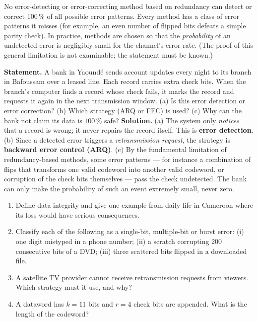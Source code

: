 \documentclass[11pt]{article}
\begin{document}
\begin{propriete}
No error-detecting or error-correcting method based on redundancy can detect or correct $100\,\%$ of all possible error patterns. Every method has a class of error patterns it misses (for example, an even number of flipped bits defeats a simple parity check). In practice, methods are chosen so that the \emph{probability} of an undetected error is negligibly small for the channel's error rate. (The proof of this general limitation is not examinable; the statement must be known.)
\end{propriete}

\begin{exoresolu}
\textbf{Statement.} A bank in Yaoundé sends account updates every night to its branch in Bafoussam over a leased line. Each record carries extra check bits. When the branch's computer finds a record whose check fails, it marks the record and requests it again in the next transmission window. (a) Is this error detection or error correction? (b) Which strategy (ARQ or FEC) is used? (c) Why can the bank not claim its data is $100\,\%$ safe?
\tcblower
\textbf{Solution.} (a) The system only \emph{notices} that a record is wrong; it never repairs the record itself. This is \textbf{error detection}. (b) Since a detected error triggers a \emph{retransmission request}, the strategy is \textbf{backward error control (ARQ)}. (c) By the fundamental limitation of redundancy-based methods, some error patterns --- for instance a combination of flips that transforms one valid codeword into another valid codeword, or corruption of the check bits themselves --- pass the check undetected. The bank can only make the probability of such an event extremely small, never zero.
\end{exoresolu}

\begin{exercice}
\begin{enumerate}
\item Define data integrity and give one example from daily life in Cameroon where its loss would have serious consequences.
\item Classify each of the following as a single-bit, multiple-bit or burst error: (i) one digit mistyped in a phone number; (ii) a scratch corrupting 200 consecutive bits of a DVD; (iii) three scattered bits flipped in a downloaded file.
\item A satellite TV provider cannot receive retransmission requests from viewers. Which strategy must it use, and why?
\item A dataword has $k = 11$ bits and $r = 4$ check bits are appended. What is the length of the codeword?
\end{enumerate}
\end{exercice}
\end{document}
